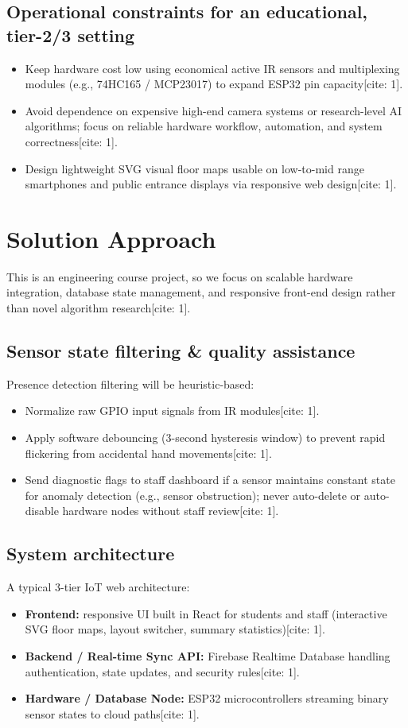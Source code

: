 \documentclass[11pt,a4paper]{article}
\begin{document}
\subsection{Operational constraints for an educational, tier-2/3 setting}
\begin{itemize}[leftmargin=0.7cm]
    \item Keep hardware cost low using economical active IR sensors and multiplexing modules (e.g., 74HC165 / MCP23017) to expand ESP32 pin capacity[cite: 1].
    \item Avoid dependence on expensive high-end camera systems or research-level AI algorithms; focus on reliable hardware workflow, automation, and system correctness[cite: 1].
    \item Design lightweight SVG visual floor maps usable on low-to-mid range smartphones and public entrance displays via responsive web design[cite: 1].
\end{itemize}

\section{Solution Approach}
This is an engineering course project, so we focus on scalable hardware integration, database state management, and responsive front-end design rather than novel algorithm research[cite: 1].

\subsection{Sensor state filtering \& quality assistance}
Presence detection filtering will be heuristic-based:
\begin{itemize}[leftmargin=0.7cm]
    \item Normalize raw GPIO input signals from IR modules[cite: 1].
    \item Apply software debouncing (3-second hysteresis window) to prevent rapid flickering from accidental hand movements[cite: 1].
    \item Send diagnostic flags to staff dashboard if a sensor maintains constant state for anomaly detection (e.g., sensor obstruction); never auto-delete or auto-disable hardware nodes without staff review[cite: 1].
\end{itemize}

\subsection{System architecture}
A typical 3-tier IoT web architecture:
\begin{itemize}[leftmargin=0.7cm]
    \item \textbf{Frontend:} responsive UI built in React for students and staff (interactive SVG floor maps, layout switcher, summary statistics)[cite: 1].
    \item \textbf{Backend / Real-time Sync API:} Firebase Realtime Database handling authentication, state updates, and security rules[cite: 1].
    \item \textbf{Hardware / Database Node:} ESP32 microcontrollers streaming binary sensor states to cloud paths[cite: 1].
\end{itemize}
\end{document}
